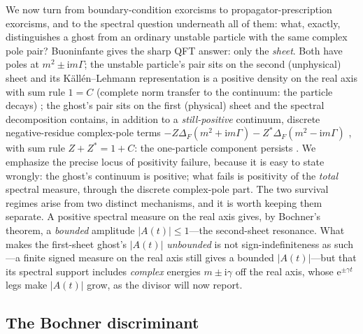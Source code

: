 \documentclass[11pt]{article}
\theoremstyle{definition}
\theoremstyle{remark}
\newcommand{\ii}{\mathrm{i}}
\newcommand{\ee}{\mathrm{e}}
\begin{document}
We now turn from boundary-condition exorcisms to
propagator-prescription exorcisms, and to the spectral question
underneath all of them: what, exactly, distinguishes a ghost from an
ordinary unstable particle with the same complex pole pair? Buoninfante
\cite{BuoninfanteP1,BuoninfanteP3} gives the sharp QFT answer: only
the \emph{sheet}. Both have poles at $m^{2}\pm\ii m\Gamma$; the
unstable particle's pair sits on the second (unphysical) sheet and its
K\"all\'en--Lehmann representation is a positive density on the real
axis with sum rule $1=C$ (complete norm transfer to the continuum:
the particle decays) \cite[Eq.~(34)]{BuoninfanteP3}; the ghost's pair
sits on the first (physical) sheet and the spectral decomposition
contains, in addition to a \emph{still-positive} continuum, discrete
negative-residue complex-pole terms
$-Z\Delta_{F}(m^{2}+\ii m\Gamma)-Z^{*}\Delta_{F}(m^{2}-\ii m\Gamma)$
\cite[Eq.~(40)]{BuoninfanteP3}, with sum rule $Z+Z^{*}=1+C$: the
one-particle component persists \cite[Eq.~(44)]{BuoninfanteP3}. We
emphasize the precise locus of positivity failure, because it is easy
to state wrongly: the ghost's continuum is positive; what fails is
positivity of the \emph{total} spectral measure, through the discrete
complex-pole part. The two survival regimes arise from two distinct
mechanisms, and it is worth keeping them separate. A positive
spectral measure on the real axis gives, by Bochner's theorem, a
\emph{bounded} amplitude $|A(t)|\le1$---the second-sheet resonance.
What makes the first-sheet ghost's $|A(t)|$ \emph{unbounded} is not
sign-indefiniteness as such---a finite signed measure on the real
axis still gives a bounded $|A(t)|$---but that its spectral support
includes \emph{complex} energies $m\pm\ii\gamma$ off the real axis,
whose $\ee^{\pm\gamma t}$ legs make $|A(t)|$ grow, as the divisor will
now report.

\subsection{The Bochner discriminant}
\end{document}
